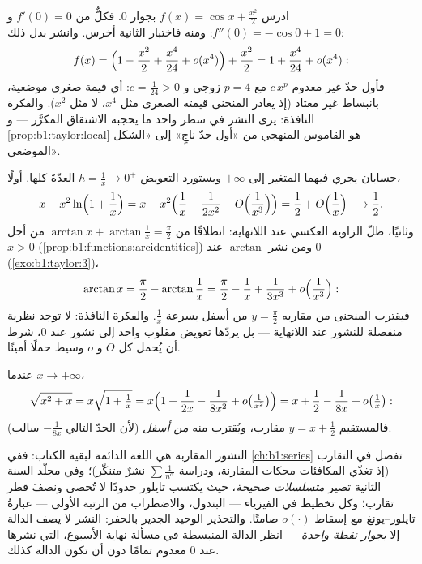 \begin{example}\label{ex:b1:taylor:flatmin}
ادرس $f(x) = \cos x + \frac{x^2}{2}$ بجوار $0$. فكلٌّ من $f'(0) =
0$ و $f''(0) = -\cos 0 + 1 = 0$: ومنه فاختبار  الثانية
أخرس. وانشر بدل ذلك:
\[
f(x) = \Bigl(1 - \frac{x^2}{2} + \frac{x^4}{24} +
o(x^4)\Bigr) + \frac{x^2}{2}
= 1 + \frac{x^4}{24} + o(x^4) :
\]
فأول حدّ غير معدوم $c\,x^p$ مع $p = 4$ زوجي و $c =
\frac{1}{24} > 0$: أي قيمة صغرى موضعية، بانبساط غير معتاد (إذ يغادر
المنحنى قيمته الصغرى مثل $x^4$، لا مثل $x^2$). والفكرة
النافذة: يرى النشر في سطر واحد ما يحجبه
الاشتقاق المكرَّر --- و \cref{prop:b1:taylor:local} هو
القاموس المنهجي من «أول حدّ ناجٍ» إلى
«الشكل الموضعي».
\end{example}

\begin{example}\label{ex:b1:taylor:atinfinity}
حسابان يجري فيهما المتغير إلى $+\infty$ ويستورد
التعويض $h = \frac1x \to 0^+$ العدّةَ كلها.
أولًا،
\[
x - x^2\ln\Bigl(1 + \frac1x\Bigr)
= x - x^2\Bigl(\frac1x - \frac{1}{2x^2} +
O\Bigl(\frac{1}{x^3}\Bigr)\Bigr)
= \frac12 + O\Bigl(\frac1x\Bigr) \longrightarrow \frac12 .
\]
وثانيًا، ظلّ الزاوية العكسي عند اللانهاية: انطلاقًا من $\arctan x +
\arctan\frac1x = \frac\pi2$ من أجل $x > 0$
(\cref{prop:b1:functions:arcidentities}) ومن نشر
$\arctan$ عند $0$ (\cref{exo:b1:taylor:3})،
\[
\arctan x = \frac\pi2 - \arctan\frac1x
= \frac\pi2 - \frac1x + \frac{1}{3x^3} +
o\Bigl(\frac{1}{x^3}\Bigr) :
\]
فيقترب المنحنى من مقاربه $y = \frac\pi2$ من أسفل بسرعة
$\frac1x$. والفكرة النافذة: لا توجد نظرية منفصلة
للنشور عند اللانهاية --- بل يردّها تعويض مقلوب واحد
إلى نشور عند $0$، شرط أن يُحمل كل $O$ و $o$
وسيط حملًا أمينًا.
\end{example}

\begin{example}\label{ex:b1:taylor:asymptote}
عندما $x \to +\infty$،
\[
\sqrt{x^2 + x} = x\sqrt{1 + \tfrac1x}
= x\Bigl(1 + \frac{1}{2x} - \frac{1}{8x^2} + o\bigl(\tfrac{1}{x^2}\bigr)\Bigr)
= x + \frac12 - \frac{1}{8x} + o\bigl(\tfrac 1x\bigr):
\]
فالمستقيم $y = x + \frac12$ مقارب، ويُقترب منه \emph{من
أسفل} (لأن الحدّ التالي $-\frac{1}{8x}$ سالب).
\end{example}

\begin{remark}
النشور المقاربة هي اللغة الدائمة لبقية
الكتاب: ففي \cref{ch:b1:series} تفصل في التقارب
(إذ تغذّي المكافئات محكات المقارنة، ودراسة $\sum
\frac{1}{n^\alpha}$ نشرٌ متنكّر)؛ وفي مجلّد السنة الثانية
تصير \emph{متسلسلات صحيحة}، حيث يكتسب 
تايلور حدودًا لا تُحصى ونصفَ قطر تقارب؛ وكل تخطيط
في الفيزياء --- البندول، والاضطراب من الرتبة الأولى --- عبارةُ
تايلور--يونغ مع إسقاط $o(\cdot)$ صامتًا. والتحذير الوحيد الجدير بالحفر:
النشر لا يصف الدالة إلا \emph{بجوار نقطة واحدة} ---
انظر الدالة المنبسطة في مسألة نهاية الأسبوع، التي نشرها عند
$0$ معدوم تمامًا دون أن تكون الدالة كذلك.
\end{remark}

